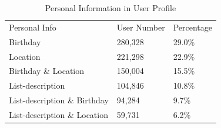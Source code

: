 \begin{table}[!htbp]
\centering
\caption{Personal Information in User Profile}
\label{tb:stat}
\begin{adjustbox}{max width=.5\textwidth}
\begin{tabular}{lll}
Personal Info & User Number & Percentage \\
Birthday & 280,328 & 29.0\% \\
Location & 221,298 & 22.9\% \\
Birthday \& Location & 150,004 & 15.5\% \\
List-description & 104,846 & 10.8\% \\
List-description \& Birthday & 94,284 & 9.7\% \\
List-description \& Location & 59,731 & 6.2\% 
\end{tabular}
\end{adjustbox}
\end{table}

